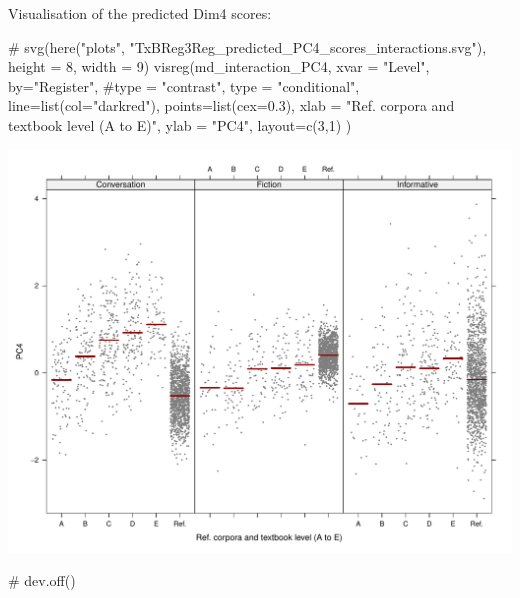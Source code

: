 \documentclass[
  letterpaper,
  DIV=11,
  numbers=noendperiod]{scrreprt}
\newenvironment{Shaded}{\begin{snugshade}}{\end{snugshade}}
\newcommand{\AttributeTok}[1]{\textcolor[rgb]{0.40,0.45,0.13}{#1}}
\newcommand{\CommentTok}[1]{\textcolor[rgb]{0.37,0.37,0.37}{#1}}
\newcommand{\DecValTok}[1]{\textcolor[rgb]{0.68,0.00,0.00}{#1}}
\newcommand{\FloatTok}[1]{\textcolor[rgb]{0.68,0.00,0.00}{#1}}
\newcommand{\FunctionTok}[1]{\textcolor[rgb]{0.28,0.35,0.67}{#1}}
\newcommand{\NormalTok}[1]{\textcolor[rgb]{0.00,0.23,0.31}{#1}}
\newcommand{\StringTok}[1]{\textcolor[rgb]{0.13,0.47,0.30}{#1}}
\begin{document}
Visualisation of the predicted Dim4 scores:

\begin{Shaded}
\begin{Highlighting}[]
\CommentTok{\# svg(here("plots", "TxBReg3Reg\_predicted\_PC4\_scores\_interactions.svg"), height = 8, width = 9)}
\FunctionTok{visreg}\NormalTok{(md\_interaction\_PC4, }\AttributeTok{xvar =} \StringTok{"Level"}\NormalTok{, }\AttributeTok{by=}\StringTok{"Register"}\NormalTok{, }
       \CommentTok{\#type = "contrast",}
       \AttributeTok{type =} \StringTok{"conditional"}\NormalTok{,}
       \AttributeTok{line=}\FunctionTok{list}\NormalTok{(}\AttributeTok{col=}\StringTok{"darkred"}\NormalTok{), }
       \AttributeTok{points=}\FunctionTok{list}\NormalTok{(}\AttributeTok{cex=}\FloatTok{0.3}\NormalTok{),}
       \AttributeTok{xlab =} \StringTok{"Ref. corpora and textbook level (A to E)"}\NormalTok{, }\AttributeTok{ylab =} \StringTok{"PC4"}\NormalTok{,}
       \AttributeTok{layout=}\FunctionTok{c}\NormalTok{(}\DecValTok{3}\NormalTok{,}\DecValTok{1}\NormalTok{)}
\NormalTok{)}
\end{Highlighting}
\end{Shaded}

\includegraphics{G_Ch7_Analysis_files/figure-pdf/Dim4estimateplots-1.pdf}

\begin{Shaded}
\begin{Highlighting}[]
\CommentTok{\# dev.off()}
\end{Highlighting}
\end{Shaded}
\end{document}
